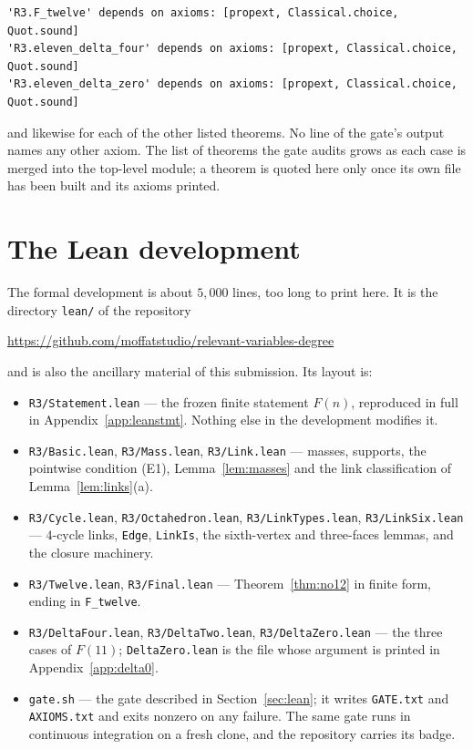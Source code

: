 \documentclass[11pt,reqno]{amsart}
\theoremstyle{plain}
\theoremstyle{definition}
\numberwithin{theorem}{section}
\begin{document}
\begin{Verbatim}[fontsize=\scriptsize,formatcom=\ttfamily,samepage=false]
'R3.F_twelve' depends on axioms: [propext, Classical.choice, Quot.sound]
'R3.eleven_delta_four' depends on axioms: [propext, Classical.choice, Quot.sound]
'R3.eleven_delta_zero' depends on axioms: [propext, Classical.choice, Quot.sound]
\end{Verbatim}

and likewise for each of the other listed theorems. No line of the gate's output names any
other axiom. The list of theorems the gate audits grows as each case is merged into the
top-level module; a theorem is quoted here only once its own file has been built and its
axioms printed.

\section{The Lean development}\label{app:leansrc}
The formal development is about $5{,}000$ lines, too long to print here. It is the directory
\texttt{lean/} of the repository
\begin{center}
  \url{https://github.com/moffatstudio/relevant-variables-degree}
\end{center}
and is also the ancillary material of this submission. Its layout is:

\begin{itemize}[leftmargin=1.4em]
  \item \texttt{R3/Statement.lean} --- the frozen finite statement $F(n)$, reproduced in full in
  Appendix~\ref{app:leanstmt}. Nothing else in the development modifies it.
  \item \texttt{R3/Basic.lean}, \texttt{R3/Mass.lean}, \texttt{R3/Link.lean} --- masses,
  supports, the pointwise condition (E1), Lemma~\ref{lem:masses} and the link classification of
  Lemma~\ref{lem:links}(a).
  \item \texttt{R3/Cycle.lean}, \texttt{R3/Octahedron.lean}, \texttt{R3/LinkTypes.lean},
  \texttt{R3/LinkSix.lean} --- $4$-cycle links, \texttt{Edge}, \texttt{LinkIs}, the sixth-vertex
  and three-faces lemmas, and the closure machinery.
  \item \texttt{R3/Twelve.lean}, \texttt{R3/Final.lean} --- Theorem~\ref{thm:no12} in finite
  form, ending in \texttt{F\_twelve}.
  \item \texttt{R3/DeltaFour.lean}, \texttt{R3/DeltaTwo.lean}, \texttt{R3/DeltaZero.lean} ---
  the three cases of $F(11)$; \texttt{DeltaZero.lean} is the file whose argument is printed in
  Appendix~\ref{app:delta0}.
  \item \texttt{gate.sh} --- the gate described in Section~\ref{sec:lean}; it writes
  \texttt{GATE.txt} and \texttt{AXIOMS.txt} and exits nonzero on any failure. The same gate runs
  in continuous integration on a fresh clone, and the repository carries its badge.
\end{itemize}
\end{document}
